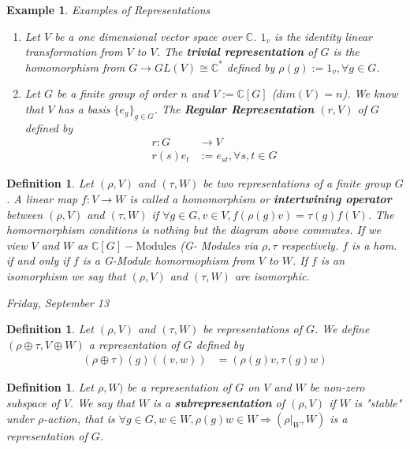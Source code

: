 \documentclass[letterpaper, leqno, 12pt]{article}
\newcommand{\fin}{\qquad \quad \hfill \framebox[1.75mm][l]{\,}}
\newcommand{\bC} {\mathbb{C}}
\theoremstyle{stdthm}
\theoremstyle{stddef}
\newtheorem{defn}[thm]{Definition}
\newtheorem{eg}[thm]{Example} %
\theoremstyle{stdnonum}
\theoremstyle{stdqands}
\theoremstyle{stdbold}
\begin{document}
\begin{eg} Examples of Representations

\begin{enumerate}
\item Let $V$ be a one dimensional vector space over $\bC$. $1_v$ is the identity linear transformation from $V$ to $V$. The {\bf trivial representation} of $G$ is the homomorphism from $G\rightarrow GL(V)\cong \bC^*$ defined by $\rho(g) := 1_v, \forall g \in G$. 

\item Let $G$ be a finite group of order $n$ and $V:= \bC[G]$ ($dim (V) = n$). We know that $V$ has a basis $\{e_g\}_{g\in G}$. The {\bf Regular Representation} $(r,V)$ of $G$ defined by 
\begin{align*}
r: G & \rightarrow V\\
r(s) e_t &:= e_{st}, \forall s,t\in G
\end{align*}
\end{enumerate}
\end{eg}

\begin{defn}
Let $(\rho,V)$ and $(\tau,W)$ be two representations of a finite group $G$. A linear map $f:V \rightarrow W$ is called a homomorphism or {\bf intertwining operator} between $(\rho,V)$ and $(\tau,W)$ if $\forall g\in G, v\in V, f(\rho(g)v) = \tau(g)f(V)$.
The homormorphism conditions is nothing but the diagram above commutes. If we view $V$ and $W$ as $\bC[G] - \text{Modules}$ (G- Modules via $\rho,\tau$ respectively. $f$ is a hom. if and only if $f$ is a G-Module homormophism from $V$ to $W$. If $f$ is an isomorphism we say that $(\rho,V)$ and $(\tau,W)$ are isomorphic.
\end{defn}

\newpage
\begin{center}
\emph{Friday, September 13}
\end{center}


\begin{defn}
Let $(\rho,V)$ and $(\tau,W)$ be representations of $G$. We define  $(\rho \oplus \tau, V \oplus W)$ a representation of $G$ defined by 
\begin{align*}
(\rho \oplus \tau)(g) ((v,w)) &= (\rho(g)v,\tau(g)w) 
\end{align*}
\end{defn}

\begin{defn}
Let $\rho, W)$ be a representation of $G$ on $V$ and $W$ be non-zero subspace of $V$. We say that $W$ is a {\bf subrepresentation} of $(\rho, V)$ if $W$ is "stable" under $\rho$-action, that is $\forall g\in G, w\in W, \rho(g)w \in W \Rightarrow (\rho|_W,W)$ is a representation of $G$. 
\end{defn}
\end{document}
